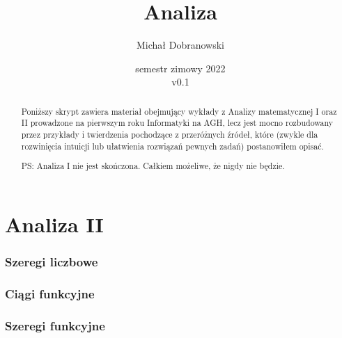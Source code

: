 \documentclass[11pt]{scrartcl}
\title{Analiza}
\author{Michał Dobranowski}
\date{semestr zimowy 2022 \\ v0.1}
\begin{document}
    \maketitle
    \begin{abstract}
        Poniższy skrypt zawiera materiał obejmujący wykłady z Analizy matematycznej I oraz II prowadzone na pierwszym roku Informatyki na AGH, lecz jest mocno rozbudowany przez przykłady i twierdzenia pochodzące z przeróżnych źródeł, które (zwykle dla rozwinięcia intuicji lub ułatwienia rozwiązań pewnych zadań) postanowiłem opisać.

        PS: Analiza I nie jest skończona. Całkiem możeliwe, że nigdy nie będzie.
    \end{abstract}
    \tableofcontents
    \eject






    \part{Analiza II}

    \section{Szeregi liczbowe}
    

    \section{Ciągi funkcyjne}
    

    \section{Szeregi funkcyjne}
    

\end{document}
